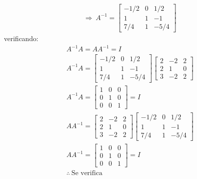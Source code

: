 	\begin{align*}
		&\Longrightarrow \ A^{-1}=\begin{bmatrix}
			-1/2&0&1/2\\
			1&1&-1\\
			7/4&1&-5/4
		\end{bmatrix}
	\end{align*}
	verificando:
	\begin{align*}
		& A^{-1}A=AA^{-1}=I\\
		&A^{-1}A=\begin{bmatrix}
			-1/2&0&1/2\\
			1&1&-1\\
			7/4&1&-5/4
		\end{bmatrix}\begin{bmatrix}
			2&-2&2\\
			2&1&0\\
			3&-2&2
		\end{bmatrix}\\
		&A^{-1}A=\begin{bmatrix}
			1&0&0\\
			0&1&0\\
			0&0&1
		\end{bmatrix}=I\\
		&AA^{-1}=\begin{bmatrix}
			2&-2&2\\
			2&1&0\\
			3&-2&2
		\end{bmatrix}\begin{bmatrix}
			-1/2&0&1/2\\
			1&1&-1\\
			7/4&1&-5/4
		\end{bmatrix}\\
		&AA^{-1}=\begin{bmatrix}
			1&0&0\\
			0&1&0\\
			0&0&1
		\end{bmatrix}=I\\
		&\therefore \ \text{Se verifica}
	\end{align*}
\hspace*{\fill}\colorbox{gray!55}{ }